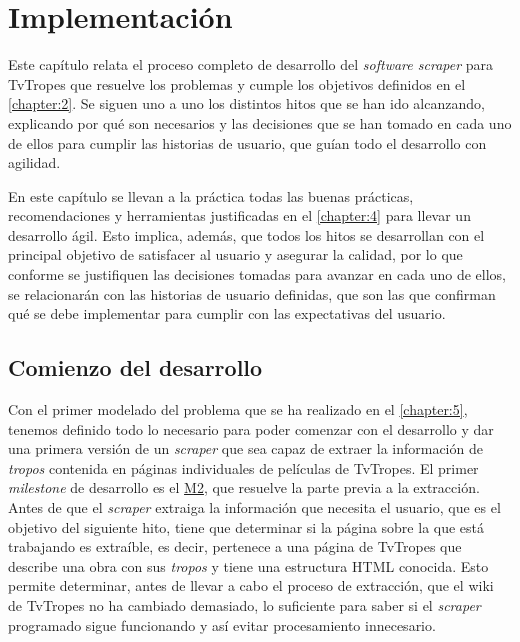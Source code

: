 \chapter{Implementación}
\label{chapter:6}

Este capítulo relata el proceso completo de desarrollo del \textit{software
scraper} para TvTropes que resuelve los problemas y cumple los objetivos
definidos en el \autoref{chapter:2}. Se siguen uno a uno los distintos hitos que
se han ido alcanzando, explicando por qué son necesarios y las decisiones que se
han tomado en cada uno de ellos para cumplir las historias de usuario, que guían
todo el desarrollo con agilidad.

En este capítulo se llevan a la práctica todas las buenas prácticas,
recomendaciones y herramientas justificadas en el \autoref{chapter:4} para
llevar un desarrollo ágil. Esto implica, además, que todos los hitos se
desarrollan con el principal objetivo de satisfacer al usuario y asegurar la
calidad, por lo que conforme se justifiquen las decisiones tomadas para avanzar
en cada uno de ellos, se relacionarán con las historias de usuario definidas,
que son las que confirman qué se debe implementar para cumplir con las
expectativas del usuario.

\section{Comienzo del desarrollo}
Con el primer modelado del problema que se ha realizado en el
\autoref{chapter:5}, tenemos definido todo lo necesario para poder comenzar con
el desarrollo y dar una primera versión de un \textit{scraper} que sea capaz de
extraer la información de \textit{tropos} contenida en páginas individuales de
películas de TvTropes. El primer \textit{milestone} de desarrollo es el
\href{https://github.com/jlgallego99/TropesToGo/milestone/3}{M2}, que resuelve
la parte previa a la extracción. Antes de que el \textit{scraper} extraiga la
información que necesita el usuario, que es el objetivo del siguiente hito,
tiene que determinar si la página sobre la que está trabajando es extraíble, es
decir, pertenece a una página de TvTropes que describe una obra con sus
\textit{tropos} y tiene una estructura HTML conocida. Esto permite determinar,
antes de llevar a cabo el proceso de extracción, que el wiki de TvTropes no ha
cambiado demasiado, lo suficiente para saber si el \textit{scraper} programado
sigue funcionando y así evitar procesamiento innecesario. 

